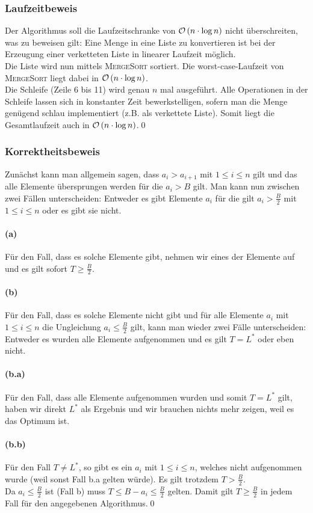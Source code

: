 \documentclass[a4paper]{article}
\begin{document}
		\subsubsection*{Laufzeitbeweis}
		Der Algorithmus soll die Laufzeitschranke von $\mathcal{O}\left(n\cdot\log{n}\right)$ nicht überschreiten, was zu beweisen gilt:\n
		Eine Menge in eine Liste zu konvertieren ist bei der Erzeugung einer verketteten Liste in linearer Laufzeit möglich.\\
		Die Liste wird nun mittels \textsc{MergeSort} sortiert. Die worst-case-Laufzeit von \textsc{MergeSort} liegt dabei in $\mathcal{O}\left(n\cdot\log{n}\right)$.\\
		Die Schleife (Zeile 6 bis 11) wird genau $n$ mal ausgeführt. Alle Operationen in der Schleife lassen sich in konstanter Zeit bewerkstelligen, sofern man die Menge genügend schlau implementiert (z.B. als verkettete Liste).\n
		Somit liegt die Gesamtlaufzeit auch in $\mathcal{O}\left(n\cdot\log{n}\right)$.\qed
		\subsubsection*{Korrektheitsbeweis}
		Zunächst kann man allgemein sagen, dass $a_i>a_{i+1}$ mit $1\leq i\leq n$ gilt und das alle Elemente übersprungen werden für die $a_i>B$ gilt.\n
		Man kann nun zwischen zwei Fällen unterscheiden: Entweder es gibt Elemente $a_i$ für die gilt $a_i>\frac{B}{2}$ mit $1\leq i\leq n$ oder es gibt sie nicht.
		\paragraph{(a)}
		Für den Fall, dass es solche Elemente gibt, nehmen wir eines der Elemente auf und es gilt sofort $T\geq\frac{B}{2}$.
		\paragraph{(b)}
		Für den Fall, dass es solche Elemente nicht gibt und für alle Elemente $a_i$ mit $1\leq i\leq n$ die Ungleichung $a_i\leq\frac{B}{2}$ gilt, kann man wieder zwei Fälle unterscheiden: Entweder es wurden alle Elemente aufgenommen und es gilt $T=L^*$ oder eben nicht.
		\paragraph{(b.a)}
		Für den Fall, dass alle Elemente aufgenommen wurden und somit $T=L^*$ gilt, haben wir direkt $L^*$ als Ergebnis und wir brauchen nichts mehr zeigen, weil es das Optimum ist.
		\paragraph{(b.b)}
		Für den Fall $T\neq L^*$, so gibt es ein $a_i$ mit $1\leq i\leq n$, welches nicht aufgenommen wurde (weil sonst Fall b.a gelten würde). Es gilt trotzdem $T>\frac{B}{2}$.\\
		Da $a_i\leq\frac{B}{2}$ ist (Fall b) muss $T\leq B-a_i\leq\frac{B}{2}$ gelten.\n
		Damit gilt $T\geq \frac{B}{2}$ in jedem Fall für den angegebenen Algorithmus.\qed
		
\end{document}

